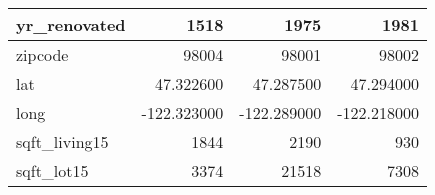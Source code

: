 \begin{table}[H]
\begin{tabular}{|l|r|r|r|}
\hline yr\_renovated & \cellcolor[rgb]{0.9, 0.54, 0.52} 1518 & 1975 & 1981 \\
\hline zipcode & \cellcolor[rgb]{0.9, 0.54, 0.52} 98004 & 98001 & 98002 \\
\hline lat & \cellcolor[rgb]{0.9, 0.54, 0.52} 47.322600 & 47.287500 & 47.294000 \\
\hline long & \cellcolor[rgb]{0.9, 0.54, 0.52} -122.323000 & \cellcolor[rgb]{0.9, 0.54, 0.52} -122.289000 & \cellcolor[rgb]{0.9, 0.54, 0.52} -122.218000 \\
\hline sqft\_living15 & \cellcolor[rgb]{0.9, 0.54, 0.52} 1844 & 2190 & 930 \\
\hline sqft\_lot15 & \cellcolor[rgb]{0.9, 0.54, 0.52} 3374 & 21518 & 7308 \\
\hline
\end{tabular}
\end{table}
